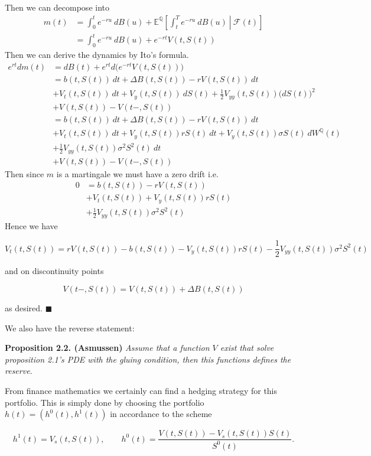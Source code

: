 \documentclass[a4paper,10pt,openany]{book}
\begin{document}
Then we can decompose into
\begin{align*}
m(t)&=\int_0^te^{-ru}\ dB(u)+\mathbb E^{\mathbb Q}\left[\left. \int_t^Te^{-ru}\ dB(u)\ \right\vert\ \mathcal F(t)\right]\\
&=\int_0^te^{-ru}\ dB(u)+e^{-rt}V(t,S(t))
\end{align*}
Then we can derive the dynamics by Ito's formula.
\begin{align*}
e^{rt}dm(t)&=dB(t)+e^{rt}d\Big(e^{-rt}V(t,S(t))\Big)\\
&=b(t,S(t))\ dt+\Delta B(t,S(t))-rV(t,S(t))\ dt\\
&+V_t(t,S(t))\ dt+V_y(t,S(t))\ dS(t)+\frac{1}{2}V_{yy}(t,S(t))\big(dS(t)\big)^2\\
&+V(t,S(t))-V(t-,S(t))\\
&=b(t,S(t))\ dt+\Delta B(t,S(t))-rV(t,S(t))\ dt\\
&+V_t(t,S(t))\ dt+V_y(t,S(t))rS(t)\ dt + V_y(t,S(t))\sigma S(t)\ dW^\mathbb Q(t)\\
&+\frac{1}{2}V_{yy}(t,S(t))\sigma^2S^2(t)\ dt\\
&+V(t,S(t))-V(t-,S(t))
\end{align*}
Then since \(m\) is a martingale we must have a zero drift i.e.
\begin{align*}
0&=b(t,S(t))-rV(t,S(t))\\
&+V_t(t,S(t))+V_y(t,S(t))rS(t)\\
&+\frac{1}{2}V_{yy}(t,S(t))\sigma^2S^2(t)
\end{align*}
Hence we have

\[
V_t(t,S(t))=rV(t,S(t))-b(t,S(t))-V_y(t,S(t))rS(t)-\frac{1}{2}V_{yy}(t,S(t))\sigma^2S^2(t)
\]

and on discontinuity points

\[
V(t-,S(t))=V(t,S(t))+\Delta B(t,S(t))
\]

as desired. \(\blacksquare\)

We also have the reverse statement:

\textbf{Proposition 2.2. (Asmussen)} \emph{Assume that a function \(V\) exist that solve proposition 2.1's PDE with the gluing condition, then this functions defines the reserve.}

From finance mathematics we certainly can find a hedging strategy for this portfolio. This is simply done by choosing the portfolio \(h(t)=(h^0(t),h^1(t))\) in accordance to the scheme

\[
h^1(t)=V_s(t,S(t)),\qquad h^0(t)=\frac{V(t,S(t))-V_s(t,S(t))S(t)}{S^0(t)}.
\]
\end{document}
